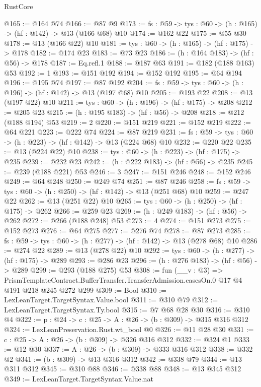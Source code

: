 \begin{lexlean}{RustCore}
\begin{coremodule}
@165 := @164 @74
@166 := @87 @9
@173 := {fs : @59} -> {tys : @60} -> (h : @165) -> (hf : @142) -> @13 (@166 @68) @10
@174 := @162 @22
@175 := @55 @30
@178 := @13 (@166 @22) @10
@181 := {tys : @60} -> (h : @165) -> (hf : @175) -> @178
@182 := @174 @23
@183 := @73 @23
@186 := (h : @164 @183) -> (hf : @56) -> @178
@187 := Eq.refl.{1}
@188 := @187 @63
@191 := @182 (@188 @163) @53
@192 := 1
@193 := @151 @192
@194 := @152 @192
@195 := @64 @194
@196 := @195 @74
@197 := @87 @192
@204 := {fs : @59} -> {tys : @60} -> (h : @196) -> (hf : @142) -> @13 (@197 @68) @10
@205 := @193 @22
@208 := @13 (@197 @22) @10
@211 := {tys : @60} -> (h : @196) -> (hf : @175) -> @208
@212 := @205 @23
@215 := (h : @195 @183) -> (hf : @56) -> @208
@218 := @212 (@188 @194) @53
@219 := 2
@220 := @151 @219
@221 := @152 @219
@222 := @64 @221
@223 := @222 @74
@224 := @87 @219
@231 := {fs : @59} -> {tys : @60} -> (h : @223) -> (hf : @142) -> @13 (@224 @68) @10
@232 := @220 @22
@235 := @13 (@224 @22) @10
@238 := {tys : @60} -> (h : @223) -> (hf : @175) -> @235
@239 := @232 @23
@242 := (h : @222 @183) -> (hf : @56) -> @235
@245 := @239 (@188 @221) @53
@246 := 3
@247 := @151 @246
@248 := @152 @246
@249 := @64 @248
@250 := @249 @74
@251 := @87 @246
@258 := {fs : @59} -> {tys : @60} -> (h : @250) -> (hf : @142) -> @13 (@251 @68) @10
@259 := @247 @22
@262 := @13 (@251 @22) @10
@265 := {tys : @60} -> (h : @250) -> (hf : @175) -> @262
@266 := @259 @23
@269 := (h : @249 @183) -> (hf : @56) -> @262
@272 := @266 (@188 @248) @53
@273 := 4
@274 := @151 @273
@275 := @152 @273
@276 := @64 @275
@277 := @276 @74
@278 := @87 @273
@285 := {fs : @59} -> {tys : @60} -> (h : @277) -> (hf : @142) -> @13 (@278 @68) @10
@286 := @274 @22
@289 := @13 (@278 @22) @10
@292 := {tys : @60} -> (h : @277) -> (hf : @175) -> @289
@293 := @286 @23
@296 := (h : @276 @183) -> (hf : @56) -> @289
@299 := @293 (@188 @275) @53
@308 := fun (__v : @3) =>
  PrismTemplateContract.BufferTransfer.TransferAdmission.casesOn.{0} @17 @4 @191 @218 @245 @272 @299
@309 := Bool
@310 := LexLeanTarget.TargetSyntax.Value.bool
@311 := @310 @79
@312 := LexLeanTarget.TargetSyntax.Ty.bool
@315 := @7 @68 @28 @30
@316 := @310 @4
@322 := {p : @24} -> {c : @25} -> {A : @26} -> (b : @309) -> @315 @316 @312
@324 := LexLeanPreservation.Rust.wt_bool @0
@326 := @11 @28 @30
@331 := {c : @25} -> {A : @26} -> (b : @309) -> @326 @316 @312
@332 := @324 @1
@333 := @12 @30
@337 := {A : @26} -> (b : @309) -> @333 @316 @312
@338 := @332 @2
@341 := (b : @309) -> @13 @316 @312
@342 := @338 @79
@344 := @13 @311 @312
@345 := @310 @88
@346 := @338 @88
@348 := @13 @345 @312
@349 := LexLeanTarget.TargetSyntax.Value.nat

\end{coremodule}
\end{lexlean}

